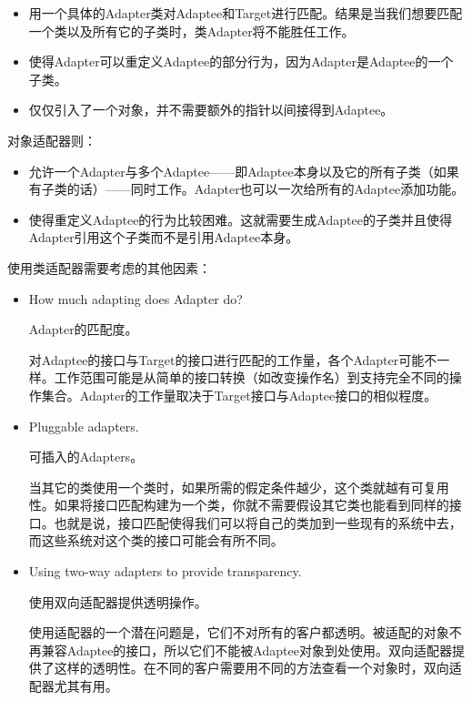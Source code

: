 \begin{itemize}

	\item 用一个具体的Adapter类对Adaptee和Target进行匹配。结果是当我们想要匹配一个类以及所有它的子类时，类Adapter将不能胜任工作。

	\item 使得Adapter可以重定义Adaptee的部分行为，因为Adapter是Adaptee的一个子类。

	\item 仅仅引入了一个对象，并不需要额外的指针以间接得到Adaptee。

\end{itemize}

对象适配器则：

\begin{itemize}

	\item 允许一个Adapter与多个Adaptee——即Adaptee本身以及它的所有子类（如果有子类的话）——同时工作。Adapter也可以一次给所有的Adaptee添加功能。

	\item 使得重定义Adaptee的行为比较困难。这就需要生成Adaptee的子类并且使得Adapter引用这个子类而不是引用Adaptee本身。

\end{itemize}

使用类适配器需要考虑的其他因素：

\begin{itemize}

	\item How much adapting does Adapter do?

	Adapter的匹配度。

	对Adaptee的接口与Target的接口进行匹配的工作量，各个Adapter可能不一样。工作范围可能是从简单的接口转换（如改变操作名）到支持完全不同的操作集合。Adapter的工作量取决于Target接口与Adaptee接口的相似程度。

	\item Pluggable adapters.

	可插入的Adapters。

	当其它的类使用一个类时，如果所需的假定条件越少，这个类就越有可复用性。如果将接口匹配构建为一个类，你就不需要假设其它类也能看到同样的接口。也就是说，接口匹配使得我们可以将自己的类加到一些现有的系统中去，而这些系统对这个类的接口可能会有所不同。

	\item Using two-way adapters to provide transparency.

	使用双向适配器提供透明操作。

	使用适配器的一个潜在问题是，它们不对所有的客户都透明。被适配的对象不再兼容Adaptee的接口，所以它们不能被Adaptee对象到处使用。双向适配器提供了这样的透明性。在不同的客户需要用不同的方法查看一个对象时，双向适配器尤其有用。

\end{itemize}

